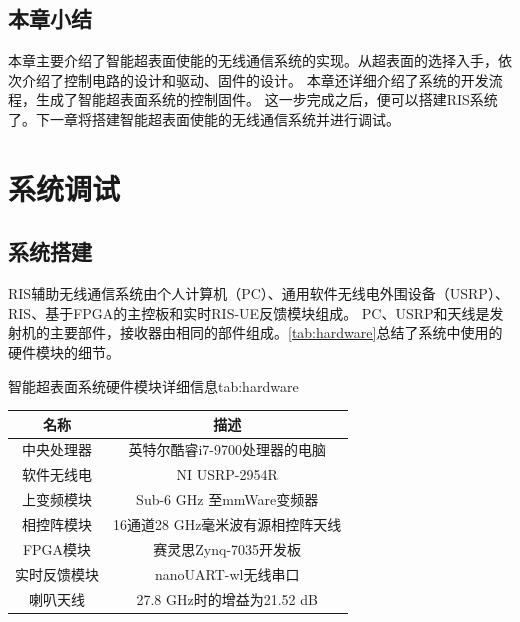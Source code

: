 \documentclass[supercite]{HustGraduPaper}
\begin{document}
\subsection{本章小结}

本章主要介绍了智能超表面使能的无线通信系统的实现。从超表面的选择入手，依次介绍了控制电路的设计和驱动、固件的设计。
本章还详细介绍了系统的开发流程，生成了智能超表面系统的控制固件。
这一步完成之后，便可以搭建RIS系统了。下一章将搭建智能超表面使能的无线通信系统并进行调试。

\section{系统调试}\label{sec:test}

\subsection{系统搭建}

RIS辅助无线通信系统由个人计算机（PC）、通用软件无线电外围设备（USRP）、RIS、基于FPGA的主控板和实时RIS-UE反馈模块组成。
PC、USRP和天线是发射机的主要部件，接收器由相同的部件组成。\autoref{tab:hardware}总结了系统中使用的硬件模块的细节。

\begin{generaltab}{智能超表面系统硬件模块详细信息}{tab:hardware}
	\begin{tabular}{cc}
		\toprule
		名称             & 描述                           \\ \midrule
		中央处理器       & 英特尔酷睿i7-9700处理器的电脑    \\
		软件无线电       & NI USRP-2954R                  \\ 
		上变频模块       & Sub-6 GHz 至mmWare变频器        \\
		相控阵模块       & 16通道28 GHz毫米波有源相控阵天线 \\
		FPGA模块        & 赛灵思Zynq-7035开发板            \\
		实时反馈模块     & nanoUART-wl无线串口             \\
		喇叭天线        & 27.8 GHz时的增益为21.52 dB       \\ 
		\bottomrule
	\end{tabular}
\end{generaltab}
\end{document}

